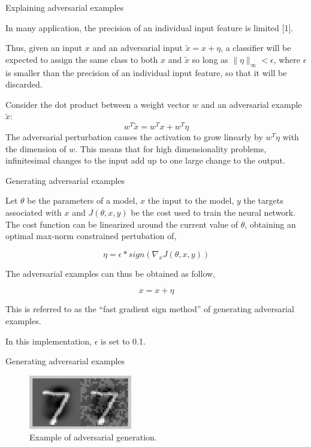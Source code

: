\begin{tframe}{Explaining adversarial examples}

In many application, the precision of an individual input feature is limited [1].

\vspace{0.1in}

Thus, given an input $ x $ and an adversarial input $ \tilde{x} = x + \eta $, a classifier will be expected to assign the same class to both $x$ and $\tilde{x}$ so long as $ \parallel \eta \parallel_\infty < \epsilon $, where $\epsilon$ is smaller than the precision of an individual input feature, so that it will be discarded.

\vspace{0.1in}

Consider the dot product between a weight vector $w$ and an adversarial example $\tilde{x}$:
$$ w^{T}\tilde{x} = w^{T}x + w^{T}\eta $$
The adversarial perturbation causes the activation to grow linearly by $w^{T}\eta$ with the dimension of $w$. This means that for high dimensionality problems, infinitesimal changes to the input add up to one large change to the output.

\end{tframe}


\begin{tframe}{Generating adversarial examples}

Let $\theta$ be the parameters of a model, $x$ the input to the model, $y$ the targets associated with $x$ and $J(\theta, x, y)$ be the cost used to train the neural network. 
The cost function can be linearized around the current value of $\theta$, obtaining an optimal max-norm constrained pertubation of,

$$ \eta = \epsilon * sign(\nabla_x J(\theta, x, y)) $$

The adversarial examples can thus be obtained as follow,

$$ x = x + \eta $$

This is referred to as the “fast gradient sign method” of generating adversarial examples.

\vspace{0.1in}

In this implementation, $\epsilon$ is set to 0.1.


\end{tframe}


\begin{tframe}{Generating adversarial examples}

\vspace{0.1in}
\vspace{0.1in}
\vspace{0.1in}

\begin{figure}
  \includegraphics[width=0.4\textwidth]{img/clean-adv.png}
  \caption{Example of adversarial generation.}
\end{figure}

\end{tframe}